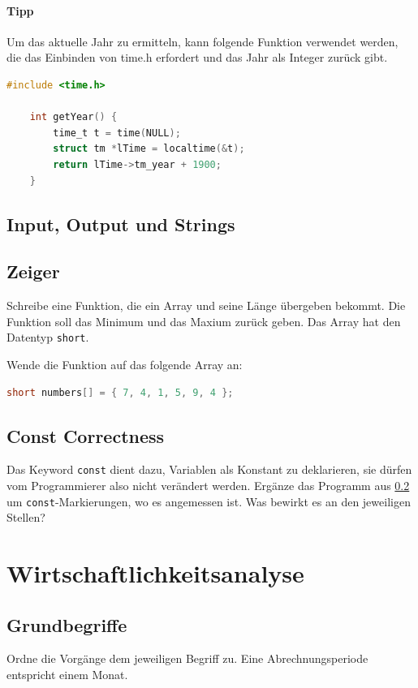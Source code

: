 \documentclass[11pt, a4paper]{article}
\begin{document}
\paragraph{Tipp} Um das aktuelle Jahr zu ermitteln, kann folgende Funktion verwendet werden, die das Einbinden von time.h erfordert und das Jahr als Integer zurück gibt.
\begin{lstlisting}[language=C]
	#include <time.h>

	int getYear() {
		time_t t = time(NULL);
		struct tm *lTime = localtime(&t);
		return lTime->tm_year + 1900;
	}
\end{lstlisting}


\subsection{Input, Output und Strings}

\subsection{Zeiger}
\label{zeigerAufgabe}
Schreibe eine Funktion, die ein Array und seine Länge übergeben bekommt. Die Funktion soll das Minimum und das Maxium zurück geben. Das Array hat den Datentyp \texttt{short}.

Wende die Funktion auf das folgende Array an:
\begin{lstlisting}[language=C]
	short numbers[] = { 7, 4, 1, 5, 9, 4 };
\end{lstlisting}


\subsection{Const Correctness}
Das Keyword \texttt{const} dient dazu, Variablen als Konstant zu deklarieren, sie dürfen vom Programmierer also nicht verändert werden. Ergänze das Programm aus \ref{zeigerAufgabe} um \texttt{const}-Markierungen, wo es angemessen ist. Was bewirkt es an den jeweiligen Stellen?


\newpage
\section{Wirtschaftlichkeitsanalyse}
\subsection{Grundbegriffe}
Ordne die Vorgänge dem jeweiligen Begriff zu. Eine Abrechnungsperiode entspricht einem Monat.
\end{document}
